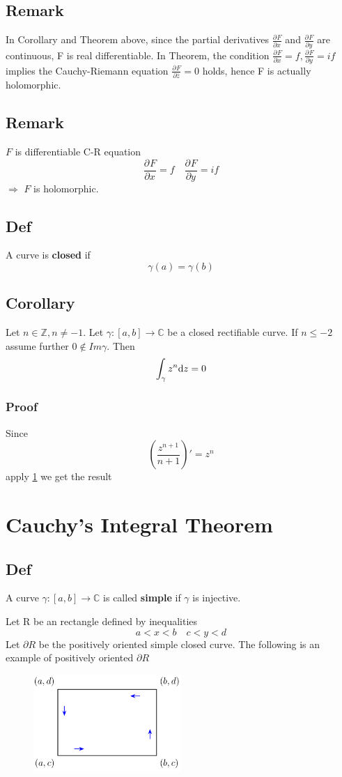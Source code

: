 \documentclass{book}
\newcommand{\fpart}[3][]{\frac{\partial^{#1}#2}{\partial #3^{#1}}}
\begin{document}
\section{Remark}
\label{remark1}
In Corollary and Theorem above, since the partial derivatives $\fpart{F}{x}$ and $\fpart{F}{y}$ are continuous, F is real differentiable. In Theorem, the condition $\fpart{F}{x}=f,\fpart{F}{y}=if$ implies the Cauchy-Riemann equation $\fpart{F}{\overline{z}}=0$ holds, hence F is actually holomorphic.
\section{Remark}
$F$ is differentiable C-R equation$$\fpart{F}{x}=f\quad \fpart{F}{y}=if$$
$\Rightarrow$ $F$ is holomorphic.
\section{Def}
A curve is \textbf{closed} if $$\gamma(a)=\gamma(b)$$
\section{Corollary}
\label{polynomial holomorphic}
Let $n\in \mathbb Z, n\neq -1$. Let $\gamma:[a,b]\to \mathbb C$ be a closed rectifiable curve. If $n\leq -2$ assume further $0\notin Im\gamma$. Then
$$\int_\gamma z^n \text dz=0$$
\subsection*{Proof}
Since $$\left(\frac{z^{n+1}}{n+1}\right)'=z^n$$
apply \ref{remark1} we get the result

\chapter{Cauchy's Integral Theorem}
\section{Def}
A curve $\gamma:[a,b]\to \mathbb C$ is called \textbf{simple} if $\gamma$ is injective.

Let R be an rectangle defined by inequalities$$a<x<b\quad c<y<d$$
Let $\partial R$ be the positively oriented simple closed curve. The following is an example of positively oriented $\partial R$
\begin{figure}[h]
    \centering
    \includegraphics[width=0.5\textwidth]{figure/1.png}
\end{figure}
\end{document}
